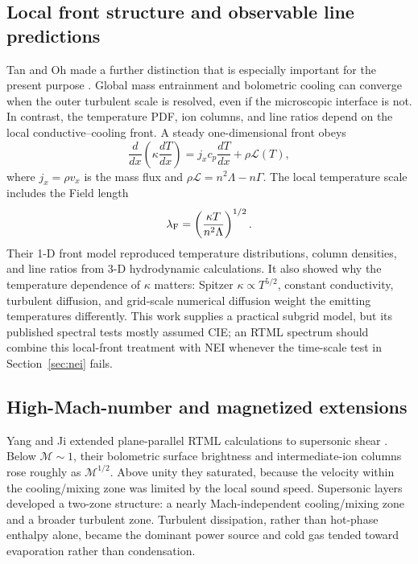 \documentclass[english,a4paper]{my_memo2}
\begin{document}
\subsection{Local front structure and observable line predictions}

Tan and Oh made a further distinction that is especially important for the
present purpose \cite{TanOh2021}.  Global mass entrainment and bolometric
cooling can converge when the outer turbulent scale is resolved, even if the
microscopic interface is not.  In contrast, the temperature PDF, ion columns,
and line ratios depend on the local conductive--cooling front.  A steady
one-dimensional front obeys
\begin{equation}
 \frac{d}{dx}\left(\kappa\frac{dT}{dx}\right)
 =j_xc_p\frac{dT}{dx}+\rho\mathcal{L}(T),
 \label{eq:front}
\end{equation}
where $j_x=\rho v_x$ is the mass flux and
$\rho\mathcal{L}=n^2\Lambda-n\Gamma$.  The local temperature scale includes
the Field length
\begin{equation}
 \lambda_{\rm F}=\left(\frac{\kappa T}{n^2\Lambda}\right)^{1/2}.
\end{equation}
Their 1-D front model reproduced temperature distributions, column densities,
and line ratios from 3-D hydrodynamic calculations.  It also showed why the
temperature dependence of $\kappa$ matters: Spitzer
$\kappa\propto T^{5/2}$, constant conductivity, turbulent diffusion, and
grid-scale numerical diffusion weight the emitting temperatures differently.
This work supplies a practical subgrid model, but its published spectral tests
mostly assumed CIE; an RTML spectrum should combine this local-front treatment
with NEI whenever the time-scale test in Section~\ref{sec:nei} fails.

\subsection{High-Mach-number and magnetized extensions}

Yang and Ji extended plane-parallel RTML calculations to supersonic shear
\cite{YangJi2023}.  Below $\mathcal{M}\sim1$, their bolometric surface
brightness and intermediate-ion columns rose roughly as $\mathcal{M}^{1/2}$.
Above unity they saturated, because the velocity within the cooling/mixing
zone was limited by the local sound speed.  Supersonic layers developed a
two-zone structure: a nearly Mach-independent cooling/mixing zone and a
broader turbulent zone.  Turbulent dissipation, rather than hot-phase enthalpy
alone, became the dominant power source and cold gas tended toward evaporation
rather than condensation.
\end{document}

